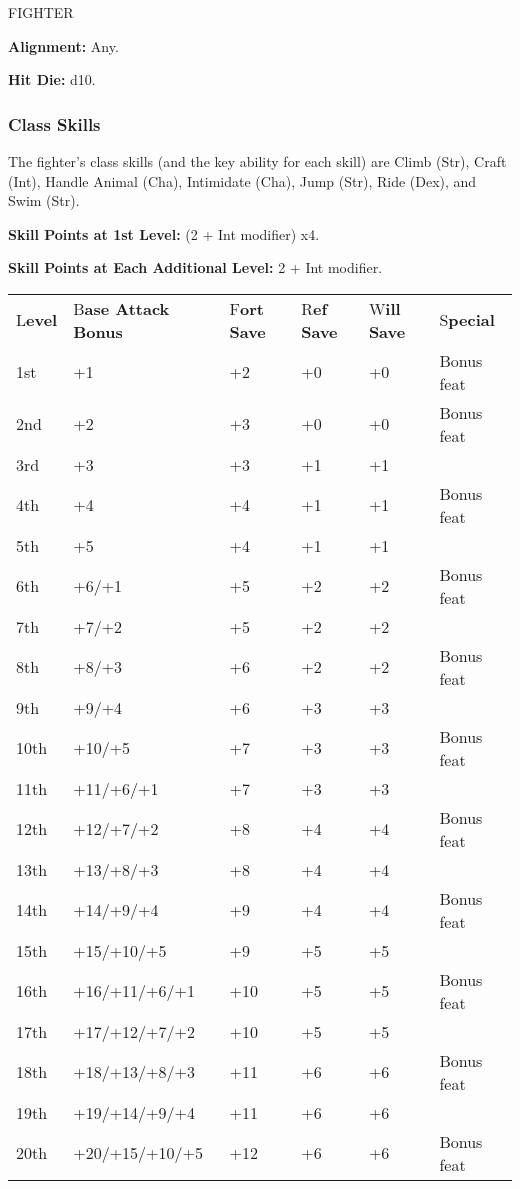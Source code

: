 \documentclass{article}
\begin{document}
\vspace{12pt}
{\LARGE{}FIGHTER}

\textbf{Alignment:} Any.

\textbf{Hit Die:} d10.

\vspace{12pt}
\subsubsection*{\textbf{Class Skills}}

The fighter's class skills (and the key ability for each skill) are Climb (Str), 
Craft (Int), Handle Animal (Cha), Intimidate (Cha), Jump (Str), Ride (Dex), and 
Swim (Str).

\textbf{Skill Points at 1st Level:} (2 + Int modifier) x$ $4.

\textbf{Skill Points at Each Additional Level:} 2 + Int modifier.

\vspace{12pt}
\begin{tabular}{|>{\raggedright}p{24pt}|>{\raggedright}p{66pt}|>{\raggedright}p{36pt}|>{\raggedright}p{32pt}|>{\raggedright}p{35pt}|>{\raggedright}p{44pt}|}
\hline
\multicolumn{6}{|p{239pt}|}{
\subsection*{T\textbf{able: The Fighter}}}\tabularnewline
\hline
L\textbf{evel} & B\textbf{ase Attack Bonus} & F\textbf{ort Save} & R\textbf{ef 
Save} & W\textbf{ill Save} & S\textbf{pecial}\tabularnewline
\hline
1st & +1 & +2 & +0 & +0 & Bonus feat\tabularnewline
\hline
2nd & +2 & +3 & +0 & +0 & Bonus feat\tabularnewline
\hline
3rd & +3 & +3 & +1 & +1 & \tabularnewline
\hline
4th & +4 & +4 & +1 & +1 & Bonus feat\tabularnewline
\hline
5th & +5 & +4 & +1 & +1 & \tabularnewline
\hline
6th & +6/+1 & +5 & +2 & +2 & Bonus feat\tabularnewline
\hline
7th & +7/+2 & +5 & +2 & +2 & \tabularnewline
\hline
8th & +8/+3 & +6 & +2 & +2 & Bonus feat\tabularnewline
\hline
9th & +9/+4 & +6 & +3 & +3 & \tabularnewline
\hline
10th & +10/+5 & +7 & +3 & +3 & Bonus feat\tabularnewline
\hline
11th & +11/+6/+1 & +7 & +3 & +3 & \tabularnewline
\hline
12th & +12/+7/+2 & +8 & +4 & +4 & Bonus feat\tabularnewline
\hline
13th & +13/+8/+3 & +8 & +4 & +4 & \tabularnewline
\hline
14th & +14/+9/+4 & +9 & +4 & +4 & Bonus feat\tabularnewline
\hline
15th & +15/+10/+5 & +9 & +5 & +5 & \tabularnewline
\hline
16th & +16/+11/+6/+1 & +10 & +5 & +5 & Bonus feat\tabularnewline
\hline
17th & +17/+12/+7/+2 & +10 & +5 & +5 & \tabularnewline
\hline
18th & +18/+13/+8/+3 & +11 & +6 & +6 & Bonus feat\tabularnewline
\hline
19th & +19/+14/+9/+4 & +11 & +6 & +6 & \tabularnewline
\hline
20th & +20/+15/+10/+5 & +12 & +6 & +6 & Bonus feat\tabularnewline
\hline
\end{tabular}
\end{document}

